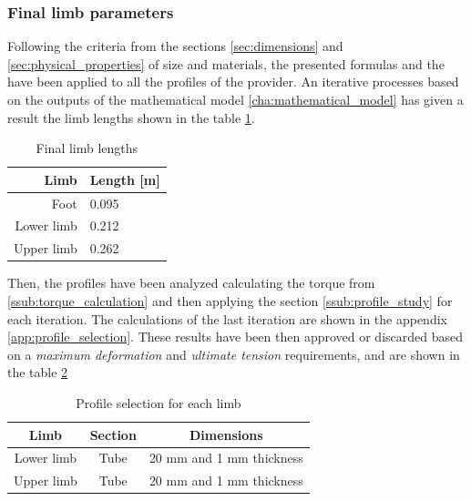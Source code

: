 \subsubsection{Final limb parameters} %
\label{ssub:final_limb_parameters}
Following the criteria from the sections \ref{sec:dimensions} and \ref{sec:physical_properties} of size and materials, the presented formulas and the have been applied to all the profiles of the provider.
An iterative processes based on the outputs of the mathematical model \ref{cha:mathematical_model} has given a result the limb lengths shown in the table \ref{tab:limb_lengths}.

\begin{table}[ht!]
\centering
\caption{Final limb lengths}
\label{tab:limb_lengths}
\begin{tabular}{r|l}
  \textbf{Limb} & \textbf{Length [m]} \\ \hline
  Foot & 0.095 \\ \hline
  Lower limb & 0.212 \\ \hline
  Upper limb & 0.262    
\end{tabular}
\end{table}


Then, the profiles have been analyzed calculating the torque from \ref{ssub:torque_calculation} and then applying the section \ref{ssub:profile_study} for each iteration.
The calculations of the last iteration are shown in the appendix \ref{app:profile_selection}.
These results have been then approved or discarded based on a \textit{maximum deformation} and \textit{ultimate tension} requirements, and are shown in the table \ref{tab:profile_selection}

\begin{table}[ht!]
\centering
\caption{Profile selection for each limb}
\label{tab:profile_selection}
\begin{tabular}{c|c|c}
  \textbf{Limb} & \textbf{Section} & \textbf{Dimensions} \\ \hline
  Lower limb & Tube & 20 mm and 1 mm thickness \\ \hline
  Upper limb & Tube & 20 mm and 1 mm thickness 
\end{tabular}
\end{table}




